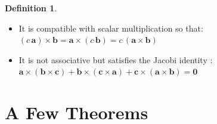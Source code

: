 \documentclass{article}
\theoremstyle{definition}
\newtheorem{definition}{Definition}[section]
\begin{document}
\begin{definition}
\begin{itemize}
\item It is compatible with scalar multiplication so that:
$(c\,\mathbf{a}) \times \mathbf{b} = \mathbf{a} \times
(c\,\mathbf{b}) = c \, (\mathbf{a} \times \mathbf{b})$


\item It is not associative but satisfies the Jacobi identity
\cite{wiki:jacobi_identity}: 
$\mathbf{a} \times (\mathbf{b} \times \mathbf{c}) + 
\mathbf{b} \times (\mathbf{c} \times \mathbf{a}) + 
\mathbf{c} \times (\mathbf{a} \times \mathbf{b}) 
= \mathbf{0}$
\end{itemize}
\end{definition}

\medskip
\section{A Few Theorems}
\bigskip
\end{document}
